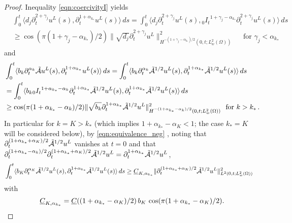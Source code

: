 \begin{proof}
Inequality \eqref{eqn:coercivityI} 
\rerevision{with $\theta=1+\gamma_j-\alpha_{k_*}\in[0,1)$}
yields
\[
\begin{aligned}
&\int_0^t\langle d_j \partial_t^{2+\gamma_j} u^L(s), \partial_t^{1+\alpha_{k_*}}u^L(s)\rangle\, ds
= \int_0^t\langle d_j \partial_t^{2+\gamma_j} u^L(s), {_0I_t}^{1+\gamma_j-\alpha_{k_*}}\partial_t^{2+\gamma_j}u^L(s) \rangle\, ds\\
&\geq \cos ( \pi(1+\gamma_j-\alpha_{k_*})/2 ) \| \sqrt{d_j}\partial_t^{2+\gamma_j} u^L \|_{H^{-(1+\gamma_j-\alpha_{k_*})/2}(0,t;L^2_w(\Omega))}^2
\quad\mbox{ for }\gamma_j<\alpha_{k_*}
\end{aligned} 
\]
and \rerevision{with $\theta=1+\alpha_{k_*}-\alpha_k\in[0,1)$}
\[
\begin{aligned}
&\int_0^t\langle b_k \partial_t^{\alpha_k} \tilde{\mathcal{A}} u^L(s), \partial_t^{1+\alpha_{k_*}}u^L(s)\rangle\, ds
=\int_0^t\langle b_k \partial_t^{\alpha_k} \tilde{\mathcal{A}}^{1/2}u^L(s), \partial_t^{1+\alpha_{k_*}}\tilde{\mathcal{A}}^{1/2}u^L(s)\rangle\, ds\\
&= \int_0^t\langle b_k {_0I_t}^{1+\alpha_{k_*}-\alpha_k}\partial_t^{1+\alpha_{k_*}} \tilde{\mathcal{A}}^{1/2}u^L(s), \partial_t^{1+\alpha_{k_*}}\tilde{\mathcal{A}}^{1/2}u^L(s) \rangle\, ds\\
&\geq \cos ( \pi(1+\alpha_{k_*}-\alpha_k)/2 ) \| \sqrt{b_k}\partial_t^{1+\alpha_{k_*}} \tilde{\mathcal{A}}^{1/2}u^L \|_{H^{-(1+\alpha_{k_*}-\alpha_k)/2}(0,t;L^2_w(\Omega))}^2
\ \mbox{ for }k>{k_*}\,.
\end{aligned} 
\]
In particular for $k=K>{k_*}$ (which implies $1+\alpha_{k_*}-\alpha_K<1$; the case $k_*=K$ will be considered below), by \eqref{eqn:equivalence_neg} 
\rerevision{with $\theta=(1+\alpha_{k_*}-\alpha_K)/2\in[0,1)$}, noting that 
$\partial_t^{(1+\alpha_{k_*}+\alpha_K)/2} \tilde{\mathcal{A}}^{1/2}u^L$ vanishes at $t=0$ and that $\partial_t^{(1+\alpha_{k_*}-\alpha_k)/2} \partial_t^{(1+\alpha_{k_*}+\alpha_K)/2}\tilde{\mathcal{A}}^{1/2}u^L
=\partial_t^{1+\alpha_{k_*}} \tilde{\mathcal{A}}^{1/2}u^L$,  
\begin{equation}\label{eqn:estbMupper}
\begin{aligned}
&\int_0^t\langle b_K \partial_t^{\alpha_K} \tilde{\mathcal{A}}^{1/2}u^L(s), \partial_t^{1+\alpha_{k_*}}\tilde{\mathcal{A}}^{1/2}u^L(s)\rangle\, ds\geq {\underline{C}_{K,\alpha_{k_*}}} \| \partial_t^{(1+\alpha_{k_*}+\alpha_K)/2}\tilde{\mathcal{A}}^{1/2}u^L \|_{L^2(0,t;L^2_w(\Omega))}^2
\end{aligned} 
\end{equation}
with 
\[
{\underline{C}_{K,\alpha_{k_*}}}=\underline{C}((1+\alpha_{k_*}-\alpha_K)/2)\, b_K\, \cos ( \pi(1+\alpha_{k_*}-\alpha_K)/2 ). 
\] 


\end{proof}

